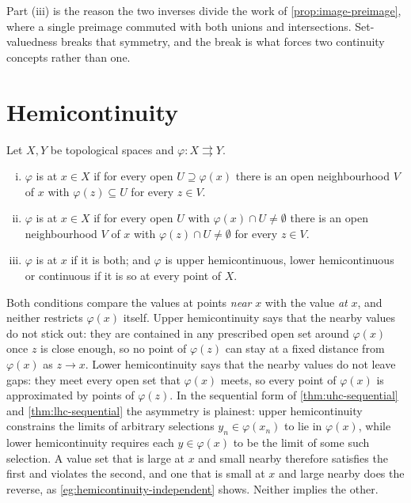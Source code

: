 Part (iii) is the reason the two inverses divide the work of
\autoref{prop:image-preimage}, where a single preimage commuted with both unions
and intersections. Set-valuedness breaks that symmetry, and the break is what
forces two continuity concepts rather than one.

\section{Hemicontinuity}\label{sec:hemicontinuity}

\begin{definition}\label{def:hemicontinuity}
	Let $X,Y$ be topological spaces and $\varphi\colon X\rightrightarrows Y$.
	\begin{enumerate}[(i)]
		\item $\varphi$ is  at
		      $x\in X$ if for every open $U\supseteq\varphi(x)$ there is an open
		      neighbourhood $V$ of $x$ with $\varphi(z)\subseteq U$ for every $z\in V$.
		\item $\varphi$ is  at
		      $x\in X$ if for every open $U$ with $\varphi(x)\cap U\neq\emptyset$ there is
		      an open neighbourhood $V$ of $x$ with $\varphi(z)\cap U\neq\emptyset$ for
		      every $z\in V$.
		\item $\varphi$ is  at $x$ if it is both; and $\varphi$ is upper
		      hemicontinuous, lower hemicontinuous or continuous if it is so at every
		      point of $X$.
	\end{enumerate}
\end{definition}

Both conditions compare the values at points \emph{near} $x$ with the value
\emph{at} $x$, and neither restricts $\varphi(x)$ itself. Upper hemicontinuity
says that the nearby values do not stick out: they are contained in any
prescribed open set around $\varphi(x)$ once $z$ is close enough, so no point of
$\varphi(z)$ can stay at a fixed distance from $\varphi(x)$ as $z\to x$. Lower
hemicontinuity says that the nearby values do not leave gaps: they meet every
open set that $\varphi(x)$ meets, so every point of $\varphi(x)$ is approximated
by points of $\varphi(z)$. In the sequential form of
\autoref{thm:uhc-sequential} and \autoref{thm:lhc-sequential} the asymmetry is
plainest: upper hemicontinuity constrains the limits of arbitrary selections
$y_n\in\varphi(x_n)$ to lie in $\varphi(x)$, while lower hemicontinuity requires
each $y\in\varphi(x)$ to be the limit of some such selection. A value set that is
large at $x$ and small nearby therefore satisfies the first and violates the
second, and one that is small at $x$ and large nearby does the reverse, as
\autoref{eg:hemicontinuity-independent} shows. Neither implies the other.


